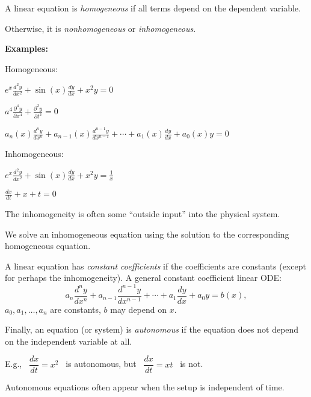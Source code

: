 \documentclass[10pt,aspectratio=169]{beamer}
\begin{document}
\begin{frame}
A linear equation is \emph{homogeneous} if all terms depend on the dependent variable.

\pause
Otherwise, it is \emph{nonhomogeneous} or \emph{inhomogeneous}.

\medskip
\pause

\textbf{Examples:}

\pause
\medskip

Homogeneous:

\pause
\vspace*{-12pt}
\hspace*{1.5in}$\displaystyle
e^x \frac{d^2 y}{dx^2} + 
\sin(x) \frac{d y}{dx} + 
x^2 y
=
0
$

\pause
\medskip

\hspace*{1.5in}$\displaystyle
a^4 \frac{\partial^4 y}{\partial x^4} + \frac{\partial^2 y}{\partial t^2} = 0
$

\pause
\medskip

\hspace*{1.5in}$\displaystyle
a_n(x) \frac{d^n y}{dx^n} + 
a_{n-1}(x) \frac{d^{n-1} y}{dx^{n-1}} + 
\cdots
+
a_{1}(x) \frac{dy}{dx}
+
a_{0}(x) y = 0
$

\pause
\medskip

Inhomogeneous:

\pause
\vspace*{-12pt}
\hspace*{1.5in}$\displaystyle
e^x \frac{d^2 y}{dx^2} + 
\sin(x) \frac{d y}{dx} + 
x^2 y
=
\frac{1}{x}
$

\pause
\medskip

\hspace*{1.5in}$\displaystyle
\frac{dx}{dt} + x + t = 0 
$

\pause
\medskip

The inhomogeneity is often some ``outside input'' into the physical
system.

\medskip
\pause

We solve an inhomogeneous equation using the solution to the corresponding
homogeneous equation.
\end{frame}

\begin{frame}
A linear equation has
\emph{constant coefficients} if the coefficients are constants (except for
perhaps the inhomogeneity).
\pause
A general constant coefficient linear ODE:
\[
a_n \frac{d^n y}{dx^n} + 
a_{n-1} \frac{d^{n-1} y}{dx^{n-1}} + 
\cdots
+
a_{1} \frac{dy}{dx}
+
a_{0} y = b(x) ,
\]
$a_0, a_1, \ldots, a_n$ are constants, $b$ may depend on $x$.

\medskip
\pause

Finally, an equation (or system) is \emph{autonomous} if the equation does
not depend on the independent variable at all.

\medskip
\pause

E.g., ~$\dfrac{dx}{dt}=x^2$~
is autonomous, but ~$\dfrac{dx}{dt}=xt$~ is not.

\medskip
\pause

Autonomous equations often appear when the setup is
independent of time.
\end{frame}
\end{document}
